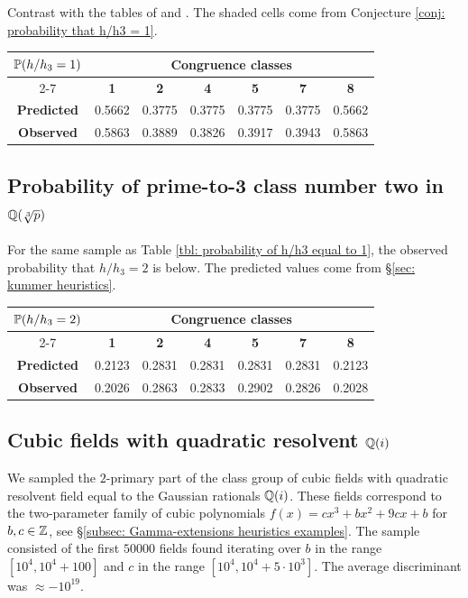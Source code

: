 \documentclass[11pt,a4paper]{amsart}
\def\Z{{\rm \mathbb{Z}}}
\def\Q{{\rm \mathbb{Q}}}
\def\P{{\rm \mathbb{P}}}
\numberwithin{equation}{section}
\begin{document}
Contrast with the tables of \cite{ShanksWilliams} and \cite{TennenhouseWilliams}. The shaded cells come from Conjecture \ref{conj: probability that h/h3 = 1}. \\

\begin{center}
\begin{tabular}{|c|c|c|c|c|c|c|}\hline
\multirow{2}{*}{$\P(h/h_3 = 1)$} & \multicolumn{6}{c|}{\textbf{Congruence classes}} \\ \cline{2-7}
 & \textbf{1} & \textbf{2} & \textbf{4} & \textbf{5} & \textbf{7} & \textbf{8} \\ \hline
\textbf{Predicted} & 0.5662 & \cellcolor{lightgray} 0.3775  & 
0.3775 & \cellcolor{lightgray} 0.3775 &  0.3775 & \cellcolor{lightgray} 0.5662 \\ \hline 
\textbf{Observed} & 0.5863  & 0.3889 & 0.3826 & 0.3917 & 0.3943 & 0.5863 \\ \hline 
\end{tabular}
\end{center}


\subsection{Probability of prime-to-3 class number two in $\Q(\sqrt[3]{p})$} 
\label{tbl: probability of h/h3 equal to 2}

For the same sample as Table \ref{tbl: probability of h/h3 equal to 1}, the observed probability that $h/h_3 = 2$ is below. The predicted values come from \S \ref{sec: kummer heuristics}. \\

\begin{center}
\begin{tabular}{|c|c|c|c|c|c|c|}\hline
\multirow{2}{*}{$\P(h/h_3 = 2)$} & \multicolumn{6}{c|}{\textbf{Congruence classes}} \\ \cline{2-7}
 & \textbf{1} & \textbf{2} & \textbf{4} & \textbf{5} & \textbf{7} & \textbf{8} \\ \hline
\textbf{Predicted} & 0.2123 & 0.2831 & 0.2831 & 0.2831 & 0.2831 & 0.2123 \\ \hline 
\textbf{Observed} & 0.2026 & 0.2863 & 0.2833 & 0.2902 & 0.2826 & 0.2028 \\ \hline 
\end{tabular}
\end{center}


\subsection{Cubic fields with quadratic resolvent $\Q(i)$} \label{tbl: cubic field with Gaussian resolvent} We sampled the $2$-primary part of the class group of cubic fields with quadratic resolvent field equal to the Gaussian rationals $\Q(i)$. These fields correspond to the two-parameter family of cubic polynomials $f(x) = cx^3+bx^2+9cx+b$ for $b,c \in \Z$, see \S \ref{subsec: Gamma-extensions heuristics examples}. The sample consisted of the first $50000$ fields found iterating over $b$ in the range $[10^4,10^4+100]$ and $c$ in the range $[10^4,10^4+5 \cdot 10^3]$. The average discriminant was $\approx -10^{19}$. \\
\end{document}
